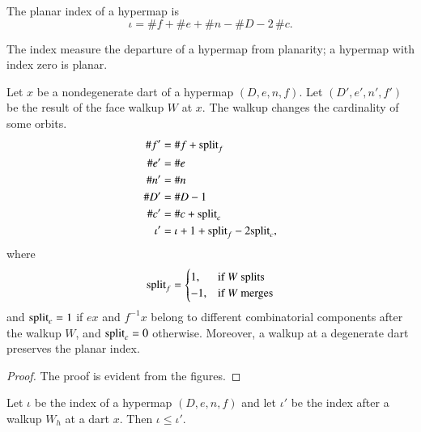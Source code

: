 \begin{definition}
The planar index of a hypermap is
\[ \iota = \# f + \# e + \# n - \# D - 2\,\#
c.\] 
%
%
\end{definition}

The index measure the departure of a hypermap from planarity; a
hypermap with index zero is planar.

\begin{lemma}\label{lemma:index} 
Let $x$ be a nondegenerate dart of a hypermap $(D,e,n,f)$. Let
$(D',e',n',f')$ be the result of the face walkup $W$ at $x$.  The
walkup changes the cardinality of some orbits.
\begin{align*}
\# f' &=\# f +{\operatorname{split}}_f  \\  
\# e'&=\# e \\
\# n'&=\# n \\
\# D'&=\# D - 1 \\
\#c'&=\# c + {\operatorname{split}}_c\\
\iota' &= \iota + 1+{\operatorname{split}}_f - 2{\operatorname{split}}_c,\\
\end{align*}
where
\[ 
{\operatorname{split}}_f = \begin{cases}
1,&\text{if $W$ splits }\\
-1,&\text{if $W$ merges}\\
\end{cases}
\] 
and ${\operatorname{split}}_c=1$ if $e x$ and $f^{-1} x$ belong to different
combinatorial components after the walkup $W$, and ${\operatorname{split}}_c=0$
otherwise. Moreover, a walkup at a degenerate dart preserves the
planar index.  %
%
%
\end{lemma}

\begin{proof} The proof is evident from the figures.
\end{proof}

\begin{lemma}\label{lemma:planar-index2}
Let $\iota$ be the index of a hypermap $(D,e,n,f)$ and let $\iota'$
be the index after a walkup $W_h$ at a dart $x$.  Then $\iota \le
\iota'$.
\end{lemma} 


